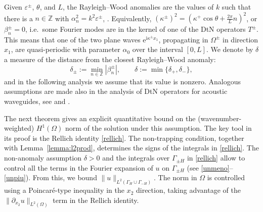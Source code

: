 \documentclass[a4paper,10pt]{article}
\newcommand{\IZ}{{\mathbb Z}}
\newcommand{\ri}{{\mathrm i}}
\newcommand{\re}{{\mathrm e}}
\newcommand{\GH}{{\Gamma_H}}
\newcommand{\GmH}{{\Gamma_{-H}}}
\newcommand{\GpmH}{{\Gamma_{\pm H}}}
\begin{document}
Given $\varepsilon^\pm$, $\theta$, and $L$, the Rayleigh--Wood anomalies are the values of $k$ 
such that there is a $n \in \IZ$ with $\alpha^2_n = k^2\varepsilon^\pm$, \cite{Pinto2020,Bruno2014}.
Equivalently, $(\kappa^{\pm})^2 = (\kappa^+\cos\theta+\frac{2\pi}{L}n)^2$, or $\beta_n^\pm=0$, i.e.\ some Fourier modes are in the kernel of one of the DtN operators $T^\pm$.
This means that one of the two plane waves $\re^{\ri \kappa^\pm x_1}$, propagating in $\Omega^\pm$ in direction $x_1$, are quasi-periodic with parameter $\alpha_0$ over the interval $[0,L]$. 
We denote by $\delta$ a measure of the distance from the closest Rayleigh--Wood anomaly:
\begin{equation} \label{distance}
\delta_\pm := \min_{n\in\IZ} |\beta_n^\pm|, \qquad
\delta := \min\{ \delta_+, \delta_- \},
\end{equation}
and in the following analysis we assume that its value is nonzero.
Analogous assumptions are made also in the analysis of DtN operators for acoustic waveguides, see \cite[eq.~(3.9)--(3.11a)]{Melenk2023} and \cite[\S2, $\beta_j\ne0$ assumption]{Monk2024}.

The next theorem gives an explicit quantitative bound on the (wavenumber-weighted) $H^1(\Omega)$ norm of the solution under this assumption.
The key tool in its proof is the Rellich identity \eqref{rellich}.
The non-trapping condition, together with Lemma~\ref{lemma:l2prod}, determines the signs of the integrals in \eqref{rellich}.
The non-anomaly assumption $\delta>0$ and the integrals over $\GpmH$ in \eqref{rellich} allow to control all the terms in the Fourier expansion of $u$ on $\GpmH$ (see \eqref{unmeno}--\eqref{unpiu}).
From this, we bound $\|u\|_{L^2(\GH\cup\GmH)}$.
The norm in $\Omega$ is controlled using a Poincaré-type inequality in the $x_2$ direction, taking advantage of the $\|\partial_{x_2}u\|_{L^2(\Omega)}$ term in the Rellich identity.
\end{document}
